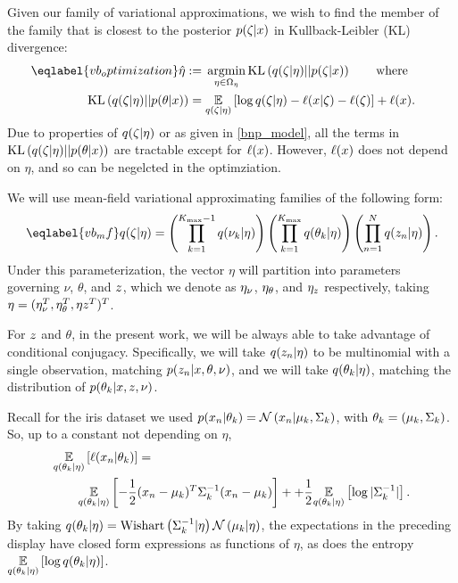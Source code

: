 Given our family of variational approximations, we wish to find the member of
the family that is closest to the posterior $p(\zeta \vert x)$ in
Kullback-Leibler (KL) divergence:
%
\begin{align}\eqlabel{vb_optimization}
%
\etaopt :={}&
    \argmin_{\eta \in \etadom}
        \KL{\q(\zeta \vert \eta) || p(\zeta \vert \x)} \mathwhere \\
\KL{\q(\zeta \vert \eta) || p(\theta \vert \x)}
={}&    \expect{\q(\zeta \vert \eta)}{
        \log \q(\zeta \vert \eta) - \logp(\x \vert \zeta) -
        \logp(\zeta)} + \logp(\x). \nonumber
%
\end{align}
%
Due to properties of $q(\zeta \vert \eta)$ or as given in \eqref{bnp_model},
all the terms in $\mathrm{KL}\left(q(\zeta \vert \eta) || p(\theta \vert x)\right)$ are tractable
except for $\ell(x)$.  However, $\ell(x)$ does not depend on $\eta$, and
so can be negelcted in the optimziation.

We will use mean-field variational approximating families of the following form:
%
\begin{align}\eqlabel{vb_mf}
%
\q(\zeta \vert \eta) =
    \left( \prod_{\k=1}^{\kmax - 1} \q(\nu_\k \vert \eta) \right)
    \left( \prod_{\k=1}^{\kmax} \q(\theta_\k \vert \eta) \right)
    \left( \prod_{\n=1}^{\N} \q(\z_{\n} \vert \eta) \right).
%
\end{align}
%
Under this parameterization, the vector $\eta$ will partition into parameters
governing $\nu$, $\theta$, and $z$, which we denote as $\eta_{\nu}$, $\eta_{\theta}$,
and $\eta_{z}$ respectively, taking $\eta = (\eta_{\nu}^T, \eta_{\theta}^T, \eta z^T)^T$.

For $z$ and $\theta$, in the present work, we will be always able to take
advantage of conditional conjugacy.  Specifically, we will take $q(z_{n}
\vert \eta)$ to be multinomial with a single observation, matching $p(z_{n}
\vert x, \theta, \nu)$, and we will take $q(\theta_k \vert \eta)$, matching
the distribution of $p(\theta_{k} \vert x, z, \nu)$.


\begin{ex}
%
Recall for the iris dataset we used $p(x_n \vert \theta_k) = \mathcal{N}\left(x_n \vert
\mu_k, \Sigma_k\right)$, with $\theta_k = (\mu_k, \Sigma_k)$.  So,
up to a constant not depending on $\eta$,
%
\begin{align*}
%
\MoveEqLeft
\expect{\q(\theta_\k \vert \eta)}{\logp(\x_\n \vert \theta_\k)} =\\
&
\expect{\q(\theta_\k \vert \eta)}{
-\frac{1}{2}(\x_n - \mu_k)^T \Sigma_\k^{-1} (\x_n - \mu_k)} +
+\frac{1}{2} \expect{\q(\theta_\k \vert \eta)}{\log |\Sigma_\k^{-1}|}.
%
\end{align*}
%
By taking $q(\theta_k \vert \eta) = \mathrm{Wishart}\left(\Sigma_k^{-1} \vert \eta\right)
\mathcal{N}\left(\mu_k \vert \eta\right)$, the expectations in the preceding display have closed
form expressions as functions of $\eta$, as does the entropy
$\underset{q(\theta_k \vert \eta)}{\mathbb{E}}\left[\log q(\theta_k \vert \eta)\right]$.
%
\end{ex}

